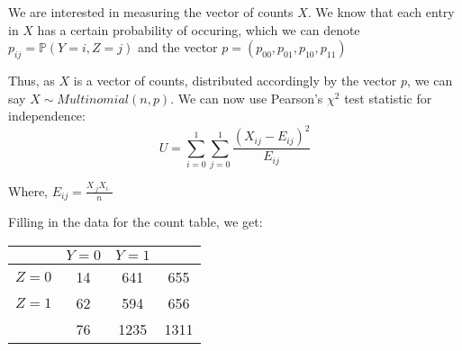 \documentclass[12pt]{article}
\begin{document}
We are interested in measuring the vector of counts $X$. We know that each entry in $X$ has a certain probability of occuring, which we can denote $p_{ij} = \mathbb{P}(Y = i, Z = j)$ and the vector $p = (p_{00}, p_{01}, p_{10}, p_{11})$

Thus, as $X$ is a vector of counts, distributed accordingly by the vector $p$, we can say $X \sim Multinomial(n, p)$. We can now use Pearson's $\chi^2$ test statistic for independence:
\[
    U = \sum_{i=0}^1\sum_{j=0}^1 \frac{(X_{ij} - E_{ij})^2}{E_{ij}}
\]

Where, $E_{ij} = \frac{X_{\cdot j}X_{i\cdot}}{n}$

\pagebreak

Filling in the data for the count table, we get:


\begin{center}
\begin{tabular}{|c|c|c|c|}
\hline
 & $Y = 0$ & $Y = 1$ & \\ 
\hline
$Z = 0$ & 14 & 641 & 655 \\ 
\hline
$Z = 1$ & 62 & 594 & 656 \\ 
\hline
 & 76 & 1235 & 1311 \\ 
\hline
\end{tabular}
\end{center}


\end{document}
